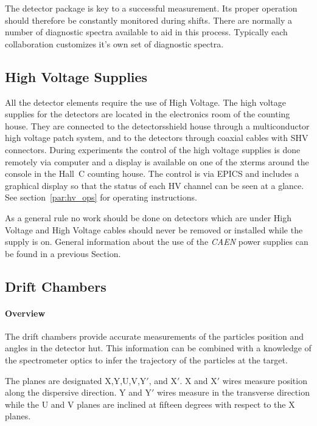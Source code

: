 The detector package is key to a successful measurement. Its
proper operation should therefore be constantly monitored during shifts. There
are normally a number of diagnostic spectra available to aid in this
process.  Typically each collaboration customizes it's own set of
diagnostic spectra.  

\subsection{High Voltage Supplies}

All the detector elements require the use of High Voltage. The
high voltage supplies for the detectors are located in the
electronics room of the counting house. They are connected to
the detectorsshield house through a multiconductor high voltage patch system,
and to the detectors through coaxial cables with SHV connectors.
During experiments the control of the high voltage supplies is
done remotely via computer and a display is available on one 
of the xterms around the console in the Hall~C counting house. The control is via
EPICS and includes a graphical display so that the status of each
HV channel can be seen at a glance. See section~\ref{par:hv_ops} for
operating instructions.

As a general rule no work should be done on detectors which are under
High Voltage and
High Voltage cables should never be removed or installed while the supply is on.
General information about the use of the {\em CAEN} power supplies can be
found in a previous Section.


\subsection{Drift Chambers}

\paragraph{Overview}

The drift chambers provide accurate measurements of the particles
position and angles in the detector hut. This information can be combined
with a knowledge of the spectrometer optics to infer the trajectory of the
particles at the target.

The planes are designated X,Y,U,V,Y$'$, and X$'$.
X and X$'$ wires measure position along the dispersive direction.
Y and Y$'$ wires measure in the transverse direction while
the U and V planes are inclined at fifteen degrees with respect to the
X planes.

